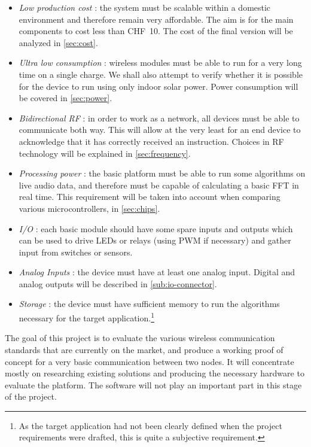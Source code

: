 \begin{itemize}
  \item \emph{Low production cost} :
    the system must be scalable within
    a domestic environment and therefore remain very affordable. The aim is for
    the main components to cost less than CHF~10. The cost of the final version
    will be analyzed in \autoref{sec:cost}.
  \item \emph{Ultra low consumption} :
    wireless modules must be able to run for a very long time on a single
    charge. We shall also attempt to verify whether it is possible for the
    device to run using only indoor solar power.  Power consumption will be
    covered in \autoref{sec:power}.
  \item \emph{Bidirectional RF} : 
    in order to work as a network, all devices must be able to communicate both
    way. This will allow at the very least for an end device to acknowledge
    that it has correctly received an instruction.
    Choices in RF technology will be explained in \autoref{sec:frequency}.
  \item \emph{Processing power} :
    the basic platform must be able to run some algorithms on live audio data,
    and therefore must be capable of calculating a basic \ac{FFT} in real time.
    This requirement will be taken into account when comparing various
    microcontrollers, in \autoref{sec:chips}.
  \item \emph{I/O} :
    each basic module should have some spare inputs and outputs which can be
    used to drive LEDs or relays (using \ac{PWM} if necessary) and gather input
    from switches or sensors.
  \item \emph{Analog Inputs} :
    the device must have at least one analog input. Digital and analog outputs
    will be described in \autoref{sub:io-connector}.
  \item \emph{Storage} :
    the device must have sufficient memory to run the algorithms necessary for
    the target application.\footnote{As the target application had not been
    clearly defined when the project requirements were drafted, this is quite
    a subjective requirement.}
\end{itemize}

The goal of this project is to evaluate the various wireless communication
standards that are currently on the market, and produce a working proof of
concept for a very basic communication between two nodes. It will concentrate
mostly on researching existing solutions and producing the necessary hardware to
evaluate the platform. The software will not play an important part in this
stage of the project.

